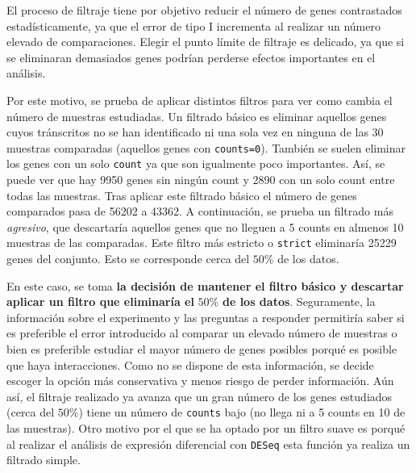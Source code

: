 \documentclass[
]{article}
\begin{document}
El proceso de filtraje tiene por objetivo reducir el número de genes
contrastados estadísticamente, ya que el error de tipo I incrementa al
realizar un número elevado de comparaciones. Elegir el punto límite de
filtraje es delicado, ya que si se eliminaran demasiados genes podrían
perderse efectos importantes en el análisis.

Por este motivo, se prueba de aplicar distintos filtros para ver como
cambia el número de muestras estudiadas. Un filtrado básico es eliminar
aquellos genes cuyos tránscritos no se han identificado ni una sola vez
en ninguna de las 30 muestras comparadas (aquellos genes con
\texttt{counts=0}). También se suelen eliminar los genes con un solo
\texttt{count} ya que son igualmente poco importantes. Así, se puede ver
que hay 9950 genes sin ningún count y 2890 con un solo count entre todas
las muestras. Tras aplicar este filtrado básico el número de genes
comparados pasa de 56202 a 43362. A continuación, se prueba un filtrado
más \emph{agresivo}, que descartaría aquellos genes que no lleguen a 5
counts en almenos 10 muestras de las comparadas. Este filtro más
estricto o \texttt{strict} eliminaría 25229 genes del conjunto. Esto se
corresponde cerca del \(50\%\) de los datos.

En este caso, se toma \textbf{la decisión de mantener el filtro básico y
descartar aplicar un filtro que eliminaría el} \(50\%\) \textbf{de los
datos}. Seguramente, la información sobre el experimento y las preguntas
a responder permitiría saber si es preferible el error introducido al
comparar un elevado número de muestras o bien es preferible estudiar el
mayor número de genes posibles porqué es posible que haya interacciones.
Como no se dispone de esta información, se decide escoger la opción más
conservativa y menos riesgo de perder información. Aún así, el filtraje
realizado ya avanza que un gran número de los genes estudiados (cerca
del \(50\%\)) tiene un número de \texttt{counts} bajo (no llega ni a 5
counts en 10 de las muestras). Otro motivo por el que se ha optado por
un filtro suave es porqué al realizar el análisis de expresión
diferencial con \texttt{DESeq} esta función ya realiza un filtrado
simple.
\end{document}
